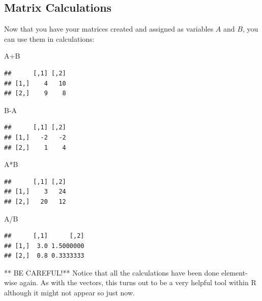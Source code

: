 \documentclass[
]{book}
\newenvironment{Shaded}{\begin{snugshade}}{\end{snugshade}}
\newcommand{\NormalTok}[1]{#1}
\newcommand{\SpecialCharTok}[1]{\textcolor[rgb]{0.00,0.00,0.00}{#1}}
\theoremstyle{definition}
\theoremstyle{definition}
\theoremstyle{definition}
\theoremstyle{definition}
\theoremstyle{remark}
\begin{document}
\hypertarget{matrix-calculations}{%
\subsection{Matrix Calculations}\label{matrix-calculations}}

Now that you have your matrices created and assigned as variables \(A\) and \(B\), you can use them in calculations:

\begin{Shaded}
\begin{Highlighting}[]
\NormalTok{A}\SpecialCharTok{+}\NormalTok{B}
\end{Highlighting}
\end{Shaded}

\begin{verbatim}
##      [,1] [,2]
## [1,]    4   10
## [2,]    9    8
\end{verbatim}

\begin{Shaded}
\begin{Highlighting}[]
\NormalTok{B}\SpecialCharTok{{-}}\NormalTok{A}
\end{Highlighting}
\end{Shaded}

\begin{verbatim}
##      [,1] [,2]
## [1,]   -2   -2
## [2,]    1    4
\end{verbatim}

\begin{Shaded}
\begin{Highlighting}[]
\NormalTok{A}\SpecialCharTok{*}\NormalTok{B}
\end{Highlighting}
\end{Shaded}

\begin{verbatim}
##      [,1] [,2]
## [1,]    3   24
## [2,]   20   12
\end{verbatim}

\begin{Shaded}
\begin{Highlighting}[]
\NormalTok{A}\SpecialCharTok{/}\NormalTok{B}
\end{Highlighting}
\end{Shaded}

\begin{verbatim}
##      [,1]      [,2]
## [1,]  3.0 1.5000000
## [2,]  0.8 0.3333333
\end{verbatim}

** BE CAREFUL!** Notice that all the calculations have been done element-wise again. As with the vectors, this turns out to be a very helpful tool within R although it might not appear so just now.
\end{document}
